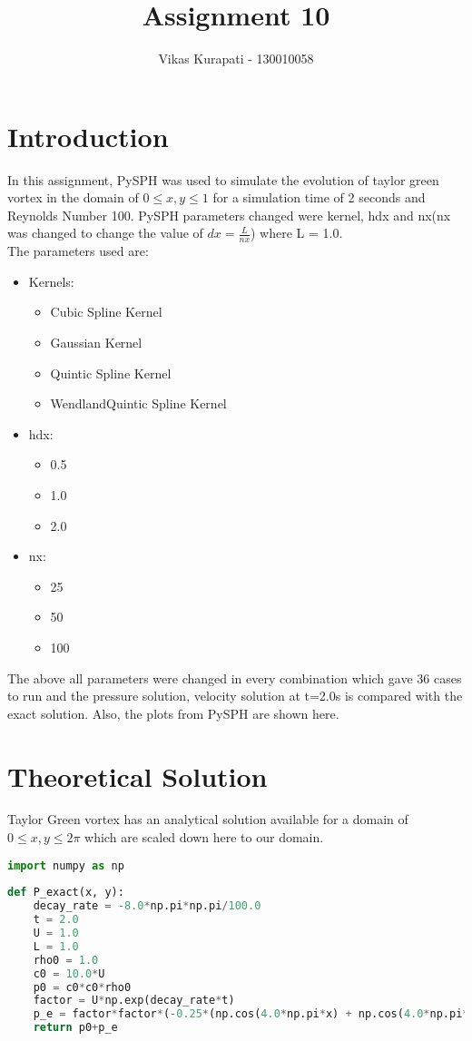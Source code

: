 \documentclass[11pt, a4paper]{article}
\title{\textbf{Assignment 10}}
\author{Vikas Kurapati - 130010058}
\begin{document}
\maketitle
\newpage
\tableofcontents
\newpage
\section{Introduction}
In this assignment, PySPH was used to simulate the evolution of taylor green vortex in the domain of $0 \leq x, y \leq 1$ for a simulation time of 2 seconds and Reynolds Number 100. PySPH parameters changed were kernel, hdx and nx(nx was changed to change the value of $dx = \frac{L}{nx}$) where L = 1.0.\\
The parameters used are:
\begin{itemize}
 \item Kernels:
 \begin{itemize}
  \item Cubic Spline Kernel
  \item Gaussian Kernel
  \item Quintic Spline Kernel
  \item WendlandQuintic Spline Kernel
 \end{itemize}
\item hdx:
\begin{itemize}
 \item 0.5
 \item 1.0
 \item 2.0
\end{itemize}
\item nx:
\begin{itemize}
 \item 25
 \item 50
 \item 100
\end{itemize}
\end{itemize}
The above all parameters were changed in every combination which gave 36 cases to run and the pressure solution, velocity solution at t=2.0s is compared with the exact solution. Also, the plots from PySPH are shown here.
\section{Theoretical Solution}
Taylor Green vortex has an analytical solution available for a domain of $0 \leq x, y \leq 2\pi$ which are scaled down here to our domain.\cite{wiki}\\
\begin{lstlisting}[language=Python, caption=Function which returns Theoretical Solution]
import numpy as np
 
def P_exact(x, y):
    decay_rate = -8.0*np.pi*np.pi/100.0
    t = 2.0
    U = 1.0
    L = 1.0
    rho0 = 1.0
    c0 = 10.0*U
    p0 = c0*c0*rho0
    factor = U*np.exp(decay_rate*t)
    p_e = factor*factor*(-0.25*(np.cos(4.0*np.pi*x) + np.cos(4.0*np.pi*y)))
    return p0+p_e
    
\end{lstlisting}
\end{document}
